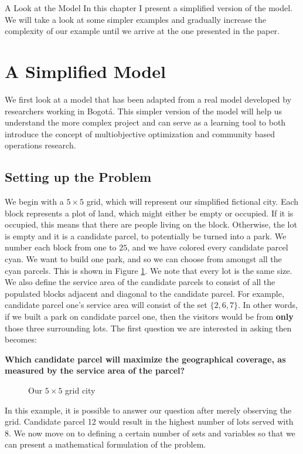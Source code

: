 \documentclass[12pt]{pom_thesis}
\theoremstyle{definition}
\begin{document}
%
%
%
%
\begin{chapter}{A Look at the Model}
In this chapter I present a simplified version of the model. We will take a look at some simpler examples and gradually increase the complexity of our example until we arrive at the one presented in the paper. 
%
%
\section{A Simplified Model} 
We first look at a model that has been adapted from a real model developed by researchers working in Bogot\'{a}. This simpler version of the model will help us understand the more complex project and can serve as a learning tool to both introduce the concept of multiobjective optimization and community based operations research.
%
%
\subsection{Setting up the Problem} \label{setting-up-problem}

We begin with a $5\times5$ grid, which will represent our simplified fictional city. Each block represents a plot of land, which might either be empty or occupied. If it is occupied, this means that there are people living on the block. Otherwise, the lot is empty and it is a candidate parcel, to potentially be turned into a park. We number each block from one to $25$, and we have colored every candidate parcel cyan. We want to build one park, and so we can choose from amongst all the cyan parcels. This is shown in Figure \ref{fig:grid1}. We note that every lot is the same size. We also define the service area of the candidate parcels to consist of all the populated blocks adjacent and diagonal to the candidate parcel. For example, candidate parcel one's service area will consist of the set $\{2,6,7\}$. In other words, if we built a park on candidate parcel one, then the visitors would be from \textbf{only} those three surrounding lots. The first question we are interested in asking then becomes: 
\begin{center}
\textbf{Which candidate parcel will maximize the geographical coverage, as measured by the service area of the parcel?}
\end{center}
\begin{figure}
 \centering
 \caption{Our $5\times 5$ grid city}
 \label{fig:grid1}
\end{figure}
In this example, it is possible to answer our question after merely observing the grid. Candidate parcel 12 would result in the highest number of lots served with 8. We now move on to defining a certain number of sets and variables so that we can present a mathematical formulation of the problem. \newline 
	

\end{chapter}
\end{document}

